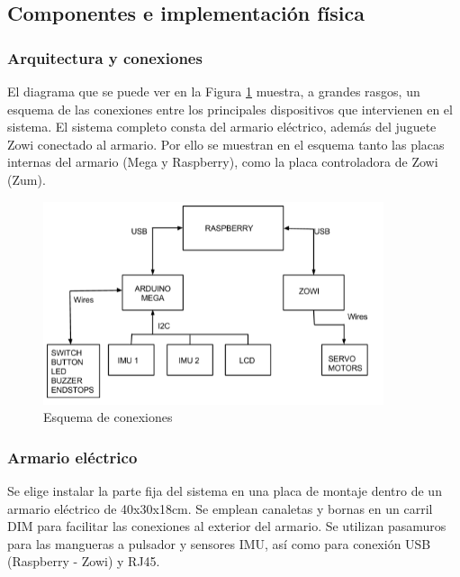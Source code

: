 \subsection{Componentes e implementación física}

\subsubsection{Arquitectura y conexiones}

El diagrama que se puede ver en la Figura \ref{fig:diagFinal} muestra, a grandes rasgos, un esquema de las conexiones entre los principales dispositivos que intervienen en el sistema. El sistema completo consta del armario eléctrico, además del juguete Zowi conectado al armario. Por ello se muestran en el esquema tanto las placas internas del armario (Mega y Raspberry), como la placa controladora de Zowi (Zum).

\begin{figure}
\centering
\includegraphics[width=100mm]{Figures/diagFinal}
\caption{Esquema de conexiones}
\label{fig:diagFinal}
\end{figure}

\subsubsection{Armario eléctrico}

Se elige instalar la parte fija del sistema en una placa de montaje dentro de un armario eléctrico de 40x30x18cm. Se emplean canaletas y bornas en un carril DIM para facilitar las conexiones al exterior del armario. Se utilizan pasamuros para las mangueras a pulsador y sensores IMU, así como para conexión USB (Raspberry - Zowi) y RJ45.

